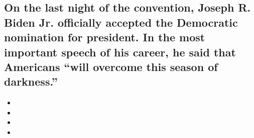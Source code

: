 \hypertarget{on-the-last-night-of-the-convention-joseph-r-biden-jr-officially-accepted-the-democratic-nomination-for-president-in-the-most-important-speech-of-his-career-he-said-that-americans-will-overcome-this-season-of-darkness-1}{%
\subsection{On the last night of the convention, Joseph R. Biden Jr.
officially accepted the Democratic nomination for president. In the most
important speech of his career, he said that Americans ``will overcome
this season of
darkness.''}\label{on-the-last-night-of-the-convention-joseph-r-biden-jr-officially-accepted-the-democratic-nomination-for-president-in-the-most-important-speech-of-his-career-he-said-that-americans-will-overcome-this-season-of-darkness-1}}

\begin{itemize}
\item
\item
\item
\item
\end{itemize}

